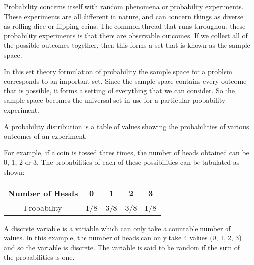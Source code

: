 \documentclass[IntroMain.tex]{subfiles}
\begin{document}
\begin{frame}
	Probability concerns itself with random phenomena or probability experiments. These experiments are all different in nature, and can concern things as diverse as rolling dice or flipping coins. The common thread that runs throughout these probability experiments is that there are observable outcomes. If we collect all of the possible outcomes together, then this forms a set that is known as the sample space.
	
	
\end{frame}
\begin{frame}
	In this set theory formulation of probability the sample space for a problem corresponds to an important set. Since the sample space contains every outcome that is possible, it forms a setting of everything that we can consider. So the sample space becomes the universal set in use for a particular probability experiment.
	
	A probability distribution is a table of values showing the probabilities of various outcomes of an experiment.
	
	
\end{frame}
\begin{frame}
	For example, if a coin is tossed three times, the number of heads obtained can be 0, 1, 2 or 3. The probabilities of each of these possibilities can be tabulated as shown:
	
	\begin{tabular}{|c|c|c|c|c|}
		\hline Number of Heads & 0 & 1 & 2 & 3 \\ 
		\hline Probability & 1/8  & 3/8  & 3/8 & 1/8 \\ 
		\hline 
	\end{tabular} 
	
	A discrete variable is a variable which can only take a countable number of values. In this example, the number of heads can only take 4 values (0, 1, 2, 3) and so the variable is discrete. The variable is said to be random if the sum of the probabilities is one. 
	
	
\end{frame}
\end{document}
